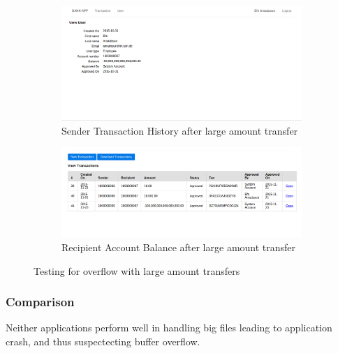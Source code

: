\begin{figure}[ht]
	\centering
	\begin{subfigure}{.45\textwidth}
		\centering
		\includegraphics[width=.9\linewidth]{figures/OTG-INPVAL-014_3.png}
		\caption{Sender Transaction History after large amount transfer}
	\end{subfigure}\hfill%
	\begin{subfigure}{.45\textwidth}
		\centering
		\includegraphics[width=.9\linewidth]{figures/OTG-INPVAL-014_4.png}
		\caption{Recipient Account Balance after large amount transfer}
	\end{subfigure}
	\caption{Testing for overflow with large amount transfers}
	\label{fig:overflow_account_history}
\end{figure}

\subsubsection{Comparison}
Neither applications perform well in handling big files leading to application crash, and thus suspectecting buffer overflow.
\clearpage